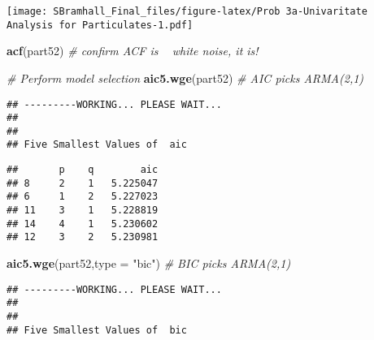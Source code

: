 \documentclass[]{article}
\newenvironment{Shaded}{\begin{snugshade}}{\end{snugshade}}
\newcommand{\KeywordTok}[1]{\textcolor[rgb]{0.13,0.29,0.53}{\textbf{#1}}}
\newcommand{\DataTypeTok}[1]{\textcolor[rgb]{0.13,0.29,0.53}{#1}}
\newcommand{\DecValTok}[1]{\textcolor[rgb]{0.00,0.00,0.81}{#1}}
\newcommand{\StringTok}[1]{\textcolor[rgb]{0.31,0.60,0.02}{#1}}
\newcommand{\CommentTok}[1]{\textcolor[rgb]{0.56,0.35,0.01}{\textit{#1}}}
\newcommand{\OperatorTok}[1]{\textcolor[rgb]{0.81,0.36,0.00}{\textbf{#1}}}
\newcommand{\NormalTok}[1]{#1}
\begin{document}
\begin{Shaded}
\end{Shaded}

\texttt{[image: SBramhall\_Final\_files/figure-latex/Prob 3a-Univaritate Analysis for Particulates-1.pdf]}

\begin{Shaded}
\begin{Highlighting}[]
\KeywordTok{acf}\NormalTok{(part52)                                         }\CommentTok{# confirm ACF is ~ white noise, it is!}

\CommentTok{# Perform model selection}
\KeywordTok{aic5.wge}\NormalTok{(part52)                                    }\CommentTok{# AIC picks ARMA(2,1)}
\end{Highlighting}
\end{Shaded}

\begin{verbatim}
## ---------WORKING... PLEASE WAIT... 
## 
## 
## Five Smallest Values of  aic
\end{verbatim}

\begin{verbatim}
##       p    q        aic
## 8     2    1   5.225047
## 6     1    2   5.227023
## 11    3    1   5.228819
## 14    4    1   5.230602
## 12    3    2   5.230981
\end{verbatim}

\begin{Shaded}
\begin{Highlighting}[]
\KeywordTok{aic5.wge}\NormalTok{(part52,}\DataTypeTok{type =} \StringTok{"bic"}\NormalTok{)                       }\CommentTok{# BIC picks ARMA(2,1)}
\end{Highlighting}
\end{Shaded}

\begin{verbatim}
## ---------WORKING... PLEASE WAIT... 
## 
## 
## Five Smallest Values of  bic
\end{verbatim}
\end{document}
